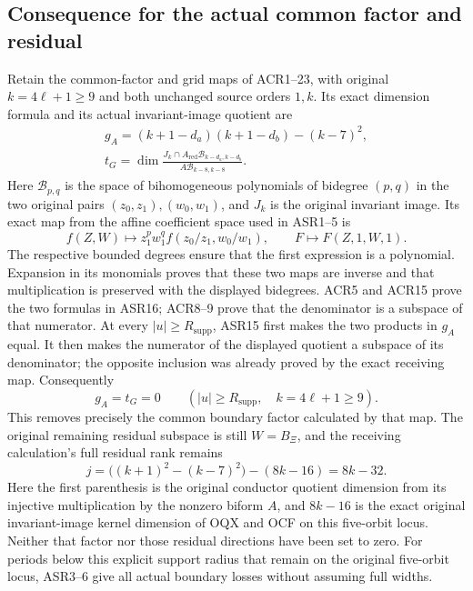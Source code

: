 \documentclass[11pt,a4paper]{article}
\begin{document}
\subsection{Consequence for the actual common factor and residual}
Retain the common-factor and grid maps of ACR1--23,
with original $k=4\ell+1\ge9$ and both unchanged source orders $1,k$.
Its exact dimension formula and its actual invariant-image quotient are
\[
\begin{gathered}
 g_A=(k+1-d_a)(k+1-d_b)-(k-7)^2,\\
 t_G=\dim\frac{J_k\cap A_{\mathrm{red}}
                       \mathcal B_{k-d_a,k-d_b}}
                      {A\mathcal B_{k-8,k-8}}.
\end{gathered}
 \tag{ASR16}
\]
Here $\mathcal B_{p,q}$ is the space of bihomogeneous polynomials of
bidegree $(p,q)$ in the two original pairs $(z_0,z_1),(w_0,w_1)$,
and $J_k$ is the original invariant image. Its exact map from the
affine coefficient space used in ASR1--5 is
\[
 f(Z,W)\longmapsto z_1^p w_1^q f(z_0/z_1,w_0/w_1),
 \qquad F\longmapsto F(Z,1,W,1).
\]
The respective bounded degrees ensure that the first expression is
a polynomial. Expansion in its monomials proves that these two maps
are inverse and that multiplication is preserved with the displayed
bidegrees. ACR5 and ACR15 prove the two formulas in ASR16;
ACR8--9 prove that the denominator
is a subspace of that numerator. At every $|u|\ge R_{\mathrm{supp}}$,
ASR15 first makes the two products in $g_A$ equal. It then makes the
numerator of the displayed quotient a subspace of its denominator;
the opposite inclusion was already proved by the exact receiving map.
Consequently
\[
 g_A=t_G=0\qquad(|u|\ge R_{\mathrm{supp}},\quad k=4\ell+1\ge9).
 \tag{ASR17}
\]
This removes precisely the common boundary factor calculated by that
map. The original remaining residual subspace is still $W=B_\Xi$,
and the receiving calculation's full residual rank remains
\[
 j=\bigl((k+1)^2-(k-7)^2\bigr)-(8k-16)=8k-32.
\]
Here the first parenthesis is the original conductor quotient dimension
from its injective multiplication by the nonzero biform $A$, and
$8k-16$ is the exact original invariant-image kernel dimension of
OQX and OCF on this five-orbit locus. Neither that factor nor those residual directions have
been set to zero. For periods below this explicit support radius that
remain on the original five-orbit locus, ASR3--6 give all actual boundary
losses without assuming full widths.
\end{document}
